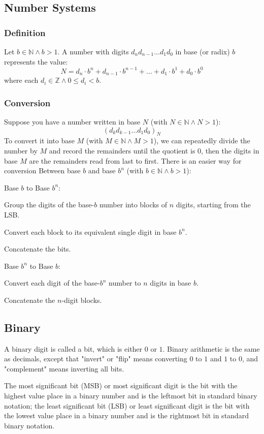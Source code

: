 \documentclass[a4paper,12pt]{report}
\begin{document}
\subsection{Number Systems}
\subsubsection{Definition}
Let $b\in\mathbb{N}\land b>1$. A number with digits $d_n d_{n-1} \dots d_1 d_0$ in base (or radix) $b$ represents the value:
\[N = d_n \cdot b^n + d_{n-1} \cdot b^{n-1} + \dots + d_1 \cdot b^1 + d_0 \cdot b^0\]
where each $d_i \in \mathbb{Z}\land 0\leq d_i<b$.
\subsubsection{Conversion}
Suppose you have a number written in base $N$ (with $N\in\mathbb{N}\land N>1$):
\[(d_k d_{k-1} \dots d_1 d_0)_N\]
To convert it into base $M$ (with $M\in\mathbb{N}\land M>1$), we can repeatedly divide the number by $M$ and record the remainders until the quotient is $0$, then the digits in base $M$ are the remainders read from last to first.
There is an easier way for conversion Between base $b$ and base $b^n$ (with $b\in\mathbb{N}\land b>1$):
\ben
\item Base $b$ to Base $b^n$:
\ben
\item Group the digits of the base-$b$ number into blocks of $n$ digits, starting from the LSB.
\item Convert each block to its equivalent single digit in base $b^n$.
\item Concatenate the bits.
\een
\item Base $b^n$ to Base $b$:
\ben
\item Convert each digit of the base-$b^n$ number to $n$ digits in base $b$.
\item Concatenate the $n$-digit blocks.
\een
\subsection{Binary}
A binary digit is called a bit, which is either $0$ or $1$. Binary arithmetic is the same as decimals, except that "invert" or "flip" means converting $0$ to $1$ and $1$ to $0$, and "complement" means inverting all bits.

The most significant bit (MSB) or most significant digit is the bit with the highest value place in a binary number and is the leftmost bit in standard binary notation; the least significant bit (LSB) or least significant digit is the bit with the lowest value place in a binary number and is the rightmost bit in standard binary notation.
\end{document}
